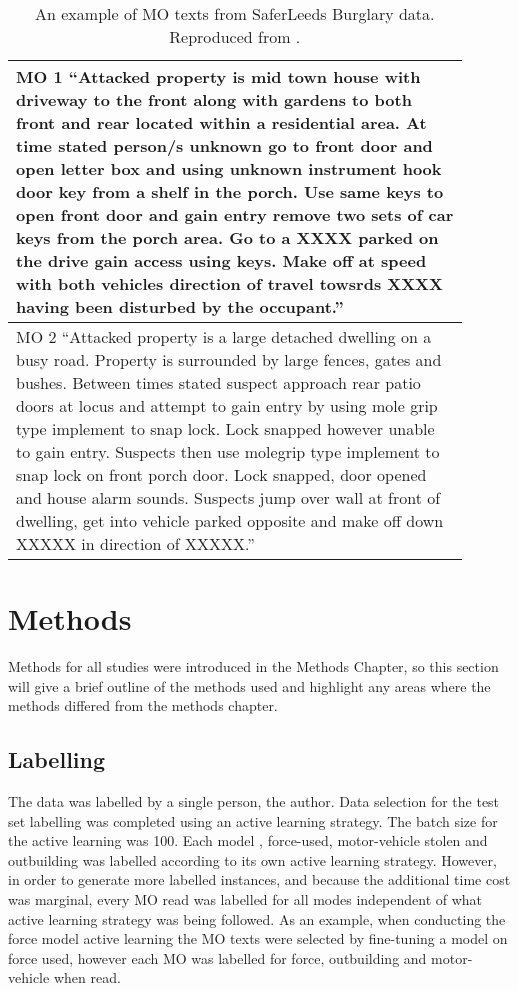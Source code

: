 \begin{table}[]
\begin{tabular}{p{0.9\linewidth}}
\toprule
MO 1 “Attacked property is mid town house with driveway to the front along with gardens to both front and rear located within a residential area. At time stated person/s unknown go to front door and open letter box and using unknown instrument hook door key from a shelf in the porch. Use same keys to open front door and gain entry remove two sets of car keys from the porch area. Go to a XXXX parked on the drive gain access using keys. Make off at speed with both vehicles direction of travel towsrds XXXX having been disturbed by the occupant.”             \\ \midrule
MO 2 “Attacked property is a large detached dwelling on a busy road. Property is surrounded by large fences, gates and bushes. Between times stated suspect approach rear patio doors at locus and attempt to gain entry by using mole grip type implement to snap lock. Lock snapped however unable to gain entry. Suspects then use molegrip type implement to snap lock on front porch door. Lock snapped, door opened and house alarm sounds. Suspects jump over wall at front of dwelling, get into vehicle parked opposite and make off down XXXXX in direction of XXXXX.” \\ \bottomrule
\end{tabular}
\caption{\label{tab:MOexample} An example of MO texts from SaferLeeds Burglary data. Reproduced from \cite{birks}.}
\end{table}


\section{Methods} Methods for all studies were introduced in the Methods Chapter, so this section will give a brief outline of the methods used and highlight any areas where the methods differed from the methods chapter.

\subsection{Labelling} The data was labelled by a single person, the author. Data selection for the test set labelling was completed using an active learning strategy. The batch size for the active learning was 100. Each model , force-used, motor-vehicle stolen and outbuilding was labelled according to its own active learning strategy. However, in order to generate more labelled instances, and because the additional time cost was marginal, every MO read was labelled for all modes independent of what active learning strategy was being followed. As an example, when conducting the force model active learning the MO texts were selected by fine-tuning a model on force used, however each MO  was labelled for force, outbuilding and motor-vehicle when read.

